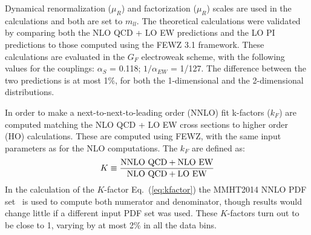 Dynamical renormalization ($\mu_{R}$) and factorization ($\mu_{R}$) scales are used in the calculations 
and both are set to $m_{ll}$.
%
The theoretical calculations were validated by comparing both the NLO QCD + LO EW predictions and the 
LO PI predictions to those computed using the FEWZ 3.1 framework. These calculations are evaluated in the $G_{F}$ electroweak scheme, with the following values for the couplings:
 $\alpha_{S}$ = 0.118; $1/\alpha_{EW}$ = 1/127. The difference between the two predictions is at most 1${\%}$, for both the 1-dimensional and the 2-dimensional distributions.

In order to make a next-to-next-to-leading order (NNLO) fit k-factors ($k_{F}$) are computed matching
 the NLO QCD + LO EW cross sections to higher order (HO) calculations. These are computed using 
FEWZ, with the same input parameters as for the NLO computations. The $k_{F}$ are defined as:
\begin{equation}
  \label{eq:kfactor}
K \equiv\frac{\rm NNLO\  QCD  + NLO\  EW}{\rm NLO\  QCD + LO\  EW}
\end{equation}
In the calculation of the $K$-factor Eq.~(\ref{eq:kfactor}) the
MMHT2014 NNLO PDF set~\cite{Harland-Lang:2014zoa}
is used to compute both numerator and denominator, though
  results would change little if a different input PDF set was used.
  These $K$-factors turn out to be close to 1, varying by at most 2\% in
  all the data bins.
  
